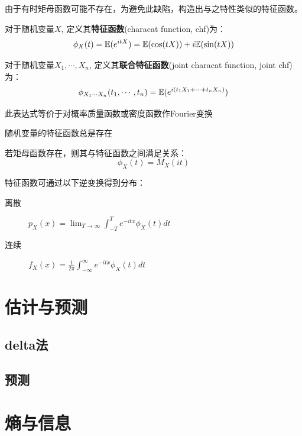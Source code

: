 由于有时矩母函数可能不存在，为避免此缺陷，构造出与之特性类似的特征函数。

\begin{definition}
    对于随机变量$X$, 定义其\textbf{特征函数}(characat function, chf)为：
    \[ \phi_X(t) = \mathbb{E}(e^{itX}) = \mathbb{E}(\cos (tX)) + i\mathbb{E}(\sin (tX))\]

    对于随机变量$X_1,\cdots, X_n$, 定义其\textbf{联合特征函数}(joint characat function, joint chf)为：
    \[ \phi_{X_1\cdots X_n}(t_1,\cdots ,t_n) = \mathbb{E}(e^{i (t_1 X_1+\cdots + t_n X_n)}) \]
\end{definition}

\begin{remark}
    此表达式等价于对概率质量函数或密度函数作Fourier变换
\end{remark}

\begin{proposition}
    随机变量的特征函数总是存在
\end{proposition}

\begin{proposition}
    若矩母函数存在，则其与特征函数之间满足关系：
    \[ \phi_X(t) = M_X(it) \]
\end{proposition}

\begin{theorem}
    特征函数可通过以下逆变换得到分布：
    \begin{description}
        \item[离散]$p_{X}(x)=\lim _{T \rightarrow \infty} \int_{-T}^{T} e^{-i t x} \phi_{X}(t) d t$
        \item[连续]$f_X(x)=\frac1{2 \pi} \int_{-\infty}^{\infty} e^{-i t x} \phi_{X}(t) d t$
    \end{description}
\end{theorem}

\section{估计与预测}

\subsection{delta法}

\subsection{预测}

\section{熵与信息}


